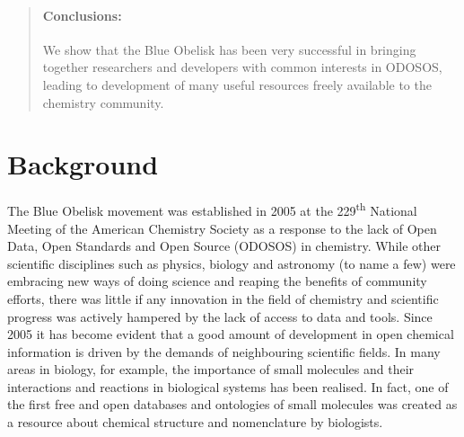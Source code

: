 \documentclass[10pt]{bmc_article}
\newenvironment{bmcformat}{\begin{raggedright}\baselineskip20pt\sloppy\setboolean{publ}{false}}{\end{raggedright}\baselineskip20pt\sloppy}
\begin{document}
\begin{bmcformat}
\begin{abstract}
        \paragraph*{Conclusions:} We show that the Blue Obelisk has been very successful
		in bringing together researchers and developers with common interests
		in ODOSOS, leading to development of many useful resources freely
		available to the chemistry community.
\end{abstract}











\section*{Background}
The Blue Obelisk movement was established in 2005 at the
229\textsuperscript{th} National Meeting of the American Chemistry
Society as a response to the lack of Open Data, Open Standards and
Open Source (ODOSOS) in chemistry. While other scientific disciplines
such as physics, biology and astronomy (to name a few) were embracing
new ways of doing science and reaping the benefits of community
efforts, there was little if any innovation in the field of chemistry
and scientific progress was actively hampered by the lack of access to
data and tools.
Since 2005 it has become evident that a good amount of development in open
chemical information is driven by the demands of neighbouring
scientific fields. In many areas in biology, for example, the importance of
small molecules and their interactions and reactions in biological systems
has been realised. In fact, one of the first free and open databases and ontologies
of small molecules was created as a resource about chemical structure and nomenclature
by biologists.\cite{DeMatos:2009p3839}


\end{bmcformat}
\end{document}

